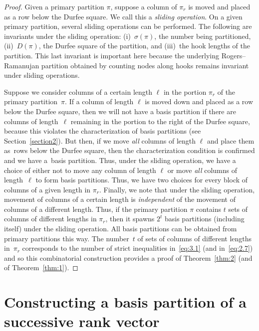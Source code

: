 \documentclass[10pt,a4paper]{amsart}
\numberwithin{equation}{section}
\theoremstyle{definition}
\begin{document}
\begin{proof} Given a primary partition $\pi$, suppose a column of
$\pi_r$ is moved and placed as a row below the Durfee square. We call
this a {\it sliding operation}. On a given primary partition, several
sliding operations can be performed. The following are invariants under
the sliding operation: (i)~$\sigma(\pi)$, the number being partitioned,
(ii)~$D(\pi)$, the Durfee square of the partition, and (iii)~the hook
lengths of the partition. This last invariant is important here
because the underlying Rogers--Ramanujan partition obtained by counting
nodes along hooks remains invariant under sliding operations.

Suppose we consider columns of a certain length $\ell$ in the portion
$\pi_r$ of the primary partition~$\pi$. If a column of length $\ell$
is moved down and placed as a row below the Durfee square, then we will
not have a basis partition if there are columns of length~$\ell$
remaining in the portion to the right of the Durfee square, because
this violates the characterization of basis partitions (see Section~\ref{section2}).
But then, if we move {\it all} columns of length $\ell$ and place them
as~rows below the Durfee square, then the characterization condition is
confirmed and we have a~basis partition. Thus, under the sliding operation,
we have a choice of either not to move any column of length $\ell$ or
move {\it all} columns of length~$\ell$ to form basis partitions. Thus, we
have two choices for every block of columns of a given length in $\pi_r$.
Finally, we note that under the sliding operation, movement of columns
of a certain length is {\it independent} of the movement of columns
of a different length. Thus, if the primary partition $\pi$ contains
$t$ sets of columns of different lengths in $\pi_r$, then it spawns
$2^t$ basis partitions (including itself) under the sliding operation.
All basis partitions can be obtained from primary partitions this way.
The number~$t$ of sets of columns of different lengths in~$\pi_r$ corresponds to the number of strict inequalities in~\eqref{eq:3.1}
(and in~\eqref{eq:2.7}) and so this combinatorial construction provides a
proof of Theorem~\ref{thm:2} (and of Theorem~\ref{thm:1}).
\end{proof}

\section{Constructing a basis partition of a successive rank vector}\label{section4}
\end{document}
